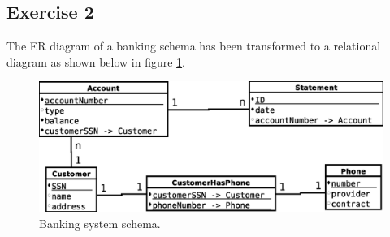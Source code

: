\subsection{Exercise 2}
The ER diagram of a banking schema has been transformed to a relational diagram as shown below in figure \ref{fig:ss3-ex2-schema}.

\begin{figure}[h]
  \centering
  \includegraphics[width=\linewidth]{3-12.03.14/exercise2.eps}
  \caption{Banking system schema.}\label{fig:ss3-ex2-schema}
\end{figure}
